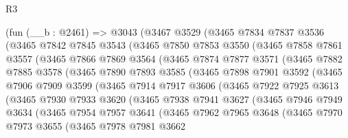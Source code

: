 \begin{lexlean}{R3}
\begin{coremodule}
    (fun (__b : @2461) =>
    @3043
      (@3467
        @3529
        (@3465
          @7834
          @7837
          @3536
          (@3465
            @7842
            @7845
            @3543
            (@3465
              @7850
              @7853
              @3550
              (@3465
                @7858
                @7861
                @3557
                (@3465
                  @7866
                  @7869
                  @3564
                  (@3465
                    @7874
                    @7877
                    @3571
                    (@3465
                      @7882
                      @7885
                      @3578
                      (@3465
                        @7890
                        @7893
                        @3585
                        (@3465
                          @7898
                          @7901
                          @3592
                          (@3465
                            @7906
                            @7909
                            @3599
                            (@3465
                              @7914
                              @7917
                              @3606
                              (@3465
                                @7922
                                @7925
                                @3613
                                (@3465
                                  @7930
                                  @7933
                                  @3620
                                  (@3465
                                    @7938
                                    @7941
                                    @3627
                                    (@3465
                                      @7946
                                      @7949
                                      @3634
                                      (@3465
                                        @7954
                                        @7957
                                        @3641
                                        (@3465
                                          @7962
                                          @7965
                                          @3648
                                          (@3465
                                            @7970
                                            @7973
                                            @3655
                                            (@3465
                                              @7978
                                              @7981
                                              @3662

\end{coremodule}
\end{lexlean}
